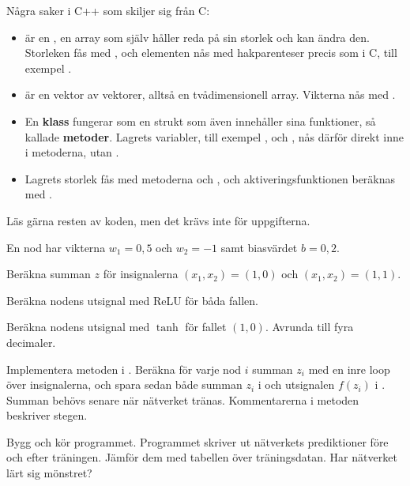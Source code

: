 Några saker i C++ som skiljer sig från C:
\begin{itemize}
  \item {} är en , en array som själv håller reda på
    sin storlek och kan ändra den. Storleken fås med , och elementen nås med
    hakparenteser precis som i C, till exempel .
  \item {} är en vektor av vektorer, alltså en tvådimensionell array. Vikterna
    nås med .
  \item En \textbf{klass} fungerar som en strukt som även innehåller sina funktioner, så kallade
    \textbf{metoder}. Lagrets variabler, till exempel ,  och
    , nås därför direkt inne i metoderna, utan .
  \item Lagrets storlek fås med metoderna  och , och
    aktiveringsfunktionen beräknas med .
\end{itemize}
Läs gärna resten av koden, men det krävs inte för uppgifterna.

En nod har vikterna $w_1 = 0{,}5$ och $w_2 = -1$ samt biasvärdet $b = 0{,}2$.
\begin{parts}
  \item Beräkna summan $z$ för insignalerna $(x_1, x_2) = (1, 0)$ och $(x_1, x_2) = (1, 1)$.
  \item Beräkna nodens utsignal med ReLU för båda fallen.
  \item Beräkna nodens utsignal med $\tanh$ för fallet $(1, 0)$. Avrunda till fyra decimaler.
\end{parts}

\begin{parts}
  \item Implementera metoden  i . Beräkna för varje nod $i$
    summan $z_i$ med en inre loop över insignalerna, och spara sedan både summan $z_i$ i
     och utsignalen $f(z_i)$ i . Summan behövs senare
    när nätverket tränas. Kommentarerna i metoden beskriver stegen.
  \item Bygg och kör programmet. Programmet skriver ut nätverkets prediktioner före och efter
    träningen. Jämför dem med tabellen över träningsdatan. Har nätverket lärt sig mönstret?
\end{parts}

